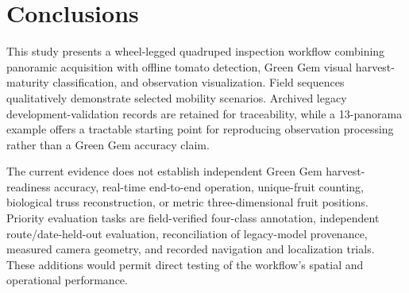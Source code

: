 \documentclass[agriengineering,article,submit,pdftex,moreauthors]{Definitions/mdpi}
\begin{document}
\section{Conclusions}
This study presents a wheel-legged quadruped inspection workflow combining panoramic acquisition with offline tomato detection, Green Gem visual harvest-maturity classification, and observation visualization. Field sequences qualitatively demonstrate selected mobility scenarios. Archived legacy development-validation records are retained for traceability, while a 13-panorama example offers a tractable starting point for reproducing observation processing rather than a Green Gem accuracy claim.

The current evidence does not establish independent Green Gem harvest-readiness accuracy, real-time end-to-end operation, unique-fruit counting, biological truss reconstruction, or metric three-dimensional fruit positions. Priority evaluation tasks are field-verified four-class annotation, independent route/date-held-out evaluation, reconciliation of legacy-model provenance, measured camera geometry, and recorded navigation and localization trials. These additions would permit direct testing of the workflow's spatial and operational performance.




\end{document}
